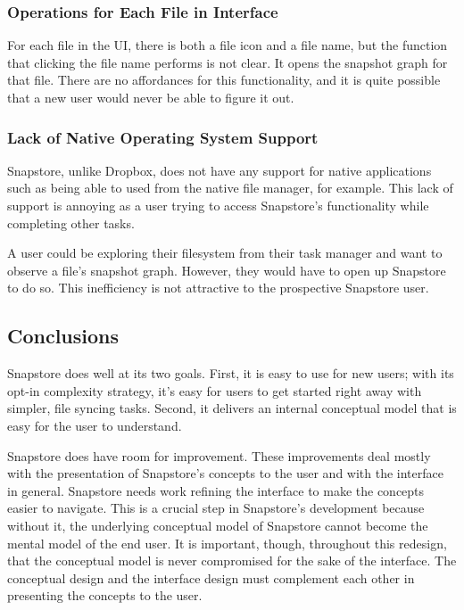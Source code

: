 \subsubsection{Operations for Each File in Interface}

For each file in the UI, there is both a file icon and a file name, but the function that clicking the file name performs is not clear. It opens the snapshot graph for that file. There are no affordances for this functionality, and it is quite possible that a new user would never be able to figure it out.

\subsubsection{Lack of Native Operating System Support}

Snapstore, unlike Dropbox, does not have any support for native applications such as being able to used from the native file manager, for example. This lack of support is annoying as a user trying to access Snapstore's functionality while completing other tasks. 

A user could be exploring their filesystem from their task manager and want to observe a file's snapshot graph. However, they would have to open up Snapstore to do so. This inefficiency is not attractive to the prospective Snapstore user.

\subsection{Conclusions}

Snapstore does well at its two goals. First, it is easy to use for new users; with its opt-in complexity strategy, it's easy for users to get started right away with simpler, file syncing tasks. Second, it delivers an internal conceptual model that is easy for the user to understand.

Snapstore does have room for improvement. These improvements deal mostly with the presentation of Snapstore's concepts to the user and with the interface in general. Snapstore needs work refining the interface to make the concepts easier to navigate. This is a crucial step in Snapstore's development because without it, the underlying conceptual model of Snapstore cannot become the mental model of the end user. It is important, though, throughout this redesign, that the conceptual model is never compromised for the sake of the interface. The conceptual design and the interface design must complement each other in presenting the concepts to the user.



